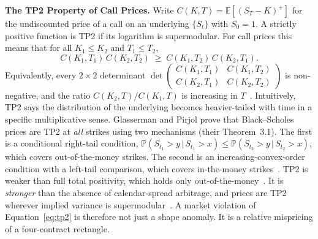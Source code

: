 \documentclass[sigconf,review,anonymous]{acmart}
\begin{document}
\medskip\noindent\textbf{The TP2 Property of Call Prices.}
\label{sec:tp2theory}
Write $C(K,T)=\mathbb{E}[(S_T-K)^+]$ for the undiscounted price of a call on an underlying $\{S_t\}$ with $S_0=1$. A strictly positive function is TP2 if its logarithm is supermodular. For call prices this means that for all $K_1\le K_2$ and $T_1\le T_2$,
\begin{equation}
C(K_1,T_1)\,C(K_2,T_2)\;\ge\;C(K_1,T_2)\,C(K_2,T_1).
\label{eq:tp2}
\end{equation}
Equivalently, every $2\times2$ determinant $\det\left(\begin{smallmatrix} C(K_1,T_1) & C(K_1,T_2)\\ C(K_2,T_1) & C(K_2,T_2)\end{smallmatrix}\right)$ is non-negative, and the ratio $C(K_2,T)/C(K_1,T)$ is increasing in $T$~\cite{glasserman2026tp2theory}. Intuitively, TP2 says the distribution of the underlying becomes heavier-tailed with time in a specific multiplicative sense. Glasserman and Pirjol prove that Black--Scholes prices are TP2 at \emph{all} strikes using two mechanisms (their Theorem~3.1). The first is a conditional right-tail condition, $\mathbb{P}(S_{t_1}>y\,|\,S_{t_1}>x)\le\mathbb{P}(S_{t_2}>y\,|\,S_{t_2}>x)$, which covers out-of-the-money strikes. The second is an increasing-convex-order condition with a left-tail comparison, which covers in-the-money strikes~\cite{glasserman2026tp2theory}. TP2 is weaker than full total positivity, which holds only out-of-the-money~\cite{glasserman2023convexity}. It is \emph{stronger} than the absence of calendar-spread arbitrage, and prices are TP2 wherever implied variance is supermodular~\cite{glasserman2026tp2theory}. A market violation of Equation~\eqref{eq:tp2} is therefore not just a shape anomaly. It is a relative mispricing of a four-contract rectangle.
\end{document}
